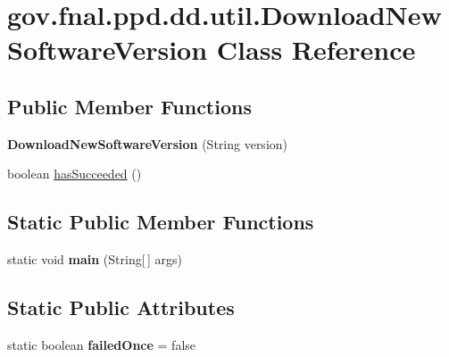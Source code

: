 \hypertarget{classgov_1_1fnal_1_1ppd_1_1dd_1_1util_1_1DownloadNewSoftwareVersion}{\section{gov.\-fnal.\-ppd.\-dd.\-util.\-Download\-New\-Software\-Version Class Reference}
\label{classgov_1_1fnal_1_1ppd_1_1dd_1_1util_1_1DownloadNewSoftwareVersion}
}
\subsection*{Public Member Functions}
\begin{DoxyCompactItemize}
\item 
\hypertarget{classgov_1_1fnal_1_1ppd_1_1dd_1_1util_1_1DownloadNewSoftwareVersion_a9a66f120b2ba0510d7b7972de80da51f}{{\bfseries Download\-New\-Software\-Version} (String version)}\label{classgov_1_1fnal_1_1ppd_1_1dd_1_1util_1_1DownloadNewSoftwareVersion_a9a66f120b2ba0510d7b7972de80da51f}

\item 
boolean \hyperlink{classgov_1_1fnal_1_1ppd_1_1dd_1_1util_1_1DownloadNewSoftwareVersion_a52e23aa564f9a29136d2e4b60205514e}{has\-Succeeded} ()
\end{DoxyCompactItemize}
\subsection*{Static Public Member Functions}
\begin{DoxyCompactItemize}
\item 
\hypertarget{classgov_1_1fnal_1_1ppd_1_1dd_1_1util_1_1DownloadNewSoftwareVersion_a2e54ce8c9ddc405b08e518931c9544e6}{static void {\bfseries main} (String\mbox{[}$\,$\mbox{]} args)}\label{classgov_1_1fnal_1_1ppd_1_1dd_1_1util_1_1DownloadNewSoftwareVersion_a2e54ce8c9ddc405b08e518931c9544e6}

\end{DoxyCompactItemize}
\subsection*{Static Public Attributes}
\begin{DoxyCompactItemize}
\item 
\hypertarget{classgov_1_1fnal_1_1ppd_1_1dd_1_1util_1_1DownloadNewSoftwareVersion_ab4dfef8f6d3204b58e58d82e514324b0}{static boolean {\bfseries failed\-Once} = false}\label{classgov_1_1fnal_1_1ppd_1_1dd_1_1util_1_1DownloadNewSoftwareVersion_ab4dfef8f6d3204b58e58d82e514324b0}

\end{DoxyCompactItemize}


